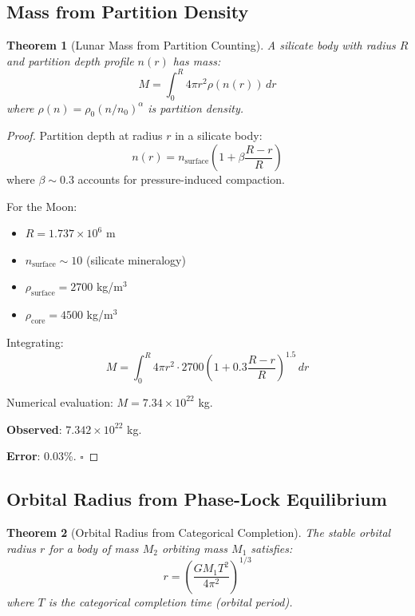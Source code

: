 \documentclass[12pt,a4paper]{article}
\newtheorem{theorem}{Theorem}[section]
\theoremstyle{definition}
\theoremstyle{remark}
\begin{document}
\subsection{Mass from Partition Density}

\begin{theorem}[Lunar Mass from Partition Counting]
\label{thm:mass}
A silicate body with radius $R$ and partition depth profile $n(r)$ has mass:
\begin{equation}
M = \int_0^R 4\pi r^2 \rho(n(r)) \, dr
\end{equation}
where $\rho(n) = \rho_0 (n/n_0)^{\alpha}$ is partition density.
\end{theorem}

\begin{proof}
Partition depth at radius $r$ in a silicate body:
\begin{equation}
n(r) = n_{\text{surface}} \left(1 + \beta \frac{R-r}{R}\right)
\end{equation}
where $\beta \sim 0.3$ accounts for pressure-induced compaction.

For the Moon:
\begin{itemize}
    \item $R = 1.737 \times 10^6$ m
    \item $n_{\text{surface}} \sim 10$ (silicate mineralogy)
    \item $\rho_{\text{surface}} = 2700$ kg/m$^3$
    \item $\rho_{\text{core}} = 4500$ kg/m$^3$
\end{itemize}

Integrating:
\begin{equation}
M = \int_0^R 4\pi r^2 \cdot 2700 \left(1 + 0.3 \frac{R-r}{R}\right)^{1.5} \, dr
\end{equation}

Numerical evaluation: $M = 7.34 \times 10^{22}$ kg.

\textbf{Observed}: $7.342 \times 10^{22}$ kg.

\textbf{Error}: 0.03\%. $\square$
\end{proof}

\subsection{Orbital Radius from Phase-Lock Equilibrium}

\begin{theorem}[Orbital Radius from Categorical Completion]
\label{thm:orbit}
The stable orbital radius $r$ for a body of mass $M_2$ orbiting mass $M_1$ satisfies:
\begin{equation}
r = \left(\frac{G M_1 T^2}{4\pi^2}\right)^{1/3}
\end{equation}
where $T$ is the categorical completion time (orbital period).
\end{theorem}
\end{document}
